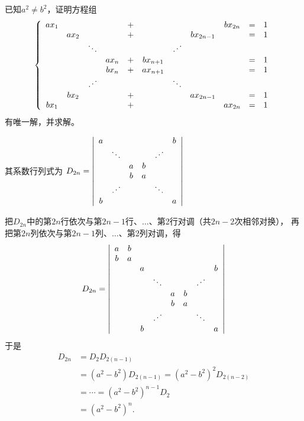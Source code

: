 \begin{frame}
  \begin{footnotesize}
    \begin{exampleblock}{50}
      已知$a^2\ne b^2$，证明方程组
      $$
      \left\{
      \begin{array}{ccccccccccc}
        ax_1&&&&+&&&&bx_{2n}&=&1\\
        &ax_2&&&+&&&bx_{2n-1}&&=&1\\
        &&\ddots&&&&\iddots&&&&\\
        &&&ax_n&+&bx_{n+1}&&&&=&1\\
        &&&bx_n&+&ax_{n+1}&&&&=&1\\
        &&\iddots&&&&\ddots&&&&\\
        &bx_2&&&+&&&ax_{2n-1}&&=&1\\
        bx_1&&&&+&&&&ax_{2n}&=&1\\
      \end{array}
      \right.
      $$
      有唯一解，并求解。
    \end{exampleblock}
    \pause
    \jiename
    其系数行列式为
    $
    D_{2n} = \left|
    \begin{array}{cccccc}
      a &     & & & & b \\
      & \ddots & & & \iddots & \\
      &   & a & b &  & \\
      &   & b & a &  &  \\
      & \iddots & & & \ddots & \\
      b &     & & & & a
    \end{array}
    \right|
    $
  \end{footnotesize}
\end{frame}

\begin{frame}
  \begin{footnotesize}
    把$D_{2n}$中的第$2n$行依次与第$2n-1$行、$\ldots$、第2行对调（共$2n-2$次相邻对换），
    再把第$2n$列依次与第$2n-1$列、$\ldots$、第2列对调，得
    $$
    D_{2n} = \left|
    \begin{array}{cccccccc}
      a & b &   &      & & & &  \\
      b & a &   & & &  & &\\
        &   & a & & &  & & b \\
      &   &   & \ddots &  &  & \iddots &   \\
      &   &   &     & a& b& & \\
      &   &   &     & b& a& & \\
      &   &   & \iddots &  &  & \ddots &   \\
      &   & b & & &  & & a
    \end{array}
    \right|
    $$
    于是
    $$
    \begin{array}{ll}
      D_{2n} & = D_2 D_{2(n-1)}  \\[0.4cm]
      & = (a^2-b^2)D_{2(n-1)} 
        = (a^2-b^2)^2 D_{2(n-2)}\\[0.4cm]
      & = \cdots 
       = (a^2-b^2)^{n-1}D_{2} \\[0.4cm]
      & = (a^2-b^2)^n.      
    \end{array}
    $$
  \end{footnotesize}
\end{frame}


